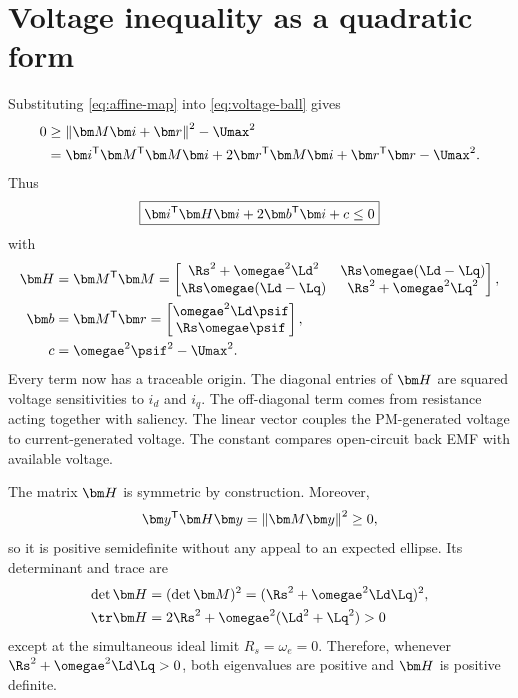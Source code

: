 \section{Voltage inequality as a quadratic form}

Substituting \cref{eq:affine-map} into \cref{eq:voltage-ball} gives
\begin{align}
0&\geq \norm{\Apsm\current+\vect r}^2-\Umax^2\\
 &=\current\trans\Apsm\trans\Apsm\current
   +2\vect r\trans\Apsm\current+\vect r\trans\vect r-\Umax^2.
\end{align}
Thus
\begin{equation}
 \boxed{\current\trans\Hpsm\current+2\vect b\trans\current+c\leq0}
 \label{eq:psm-general-quadratic}
\end{equation}
with
\begin{align}
\Hpsm&=\Apsm\trans\Apsm
=\begin{bmatrix}
\Rs^2+\omegae^2\Ld^2&\Rs\omegae(\Ld-\Lq)\\
\Rs\omegae(\Ld-\Lq)&\Rs^2+\omegae^2\Lq^2
\end{bmatrix},\label{eq:Hpsm}\\
\vect b&=\Apsm\trans\vect r
=\begin{bmatrix}\omegae^2\Ld\psif\\\Rs\omegae\psif\end{bmatrix},
\label{eq:bpsm}\\
c&=\omegae^2\psif^2-\Umax^2.\label{eq:cpsm}
\end{align}
Every term now has a traceable origin.  The diagonal entries of $\Hpsm$ are
squared voltage sensitivities to $i_d$ and $i_q$.  The off-diagonal term comes
from resistance acting together with saliency.  The linear vector couples the
PM-generated voltage to current-generated voltage.  The constant compares
open-circuit back EMF with available voltage.

The matrix $\Hpsm$ is symmetric by construction.  Moreover,
\begin{equation}
 \vect y\trans\Hpsm\vect y=\norm{\Apsm\vect y}^2\geq0,
\end{equation}
so it is positive semidefinite without any appeal to an expected ellipse.  Its
determinant and trace are
\begin{align}
\det\Hpsm&=(\det\Apsm)^2
=(\Rs^2+\omegae^2\Ld\Lq)^2,\label{eq:detH}\\
\tr\Hpsm&=2\Rs^2+\omegae^2(\Ld^2+\Lq^2)>0
\end{align}
except at the simultaneous ideal limit $R_s=\omega_e=0$.  Therefore, whenever
$\Rs^2+\omegae^2\Ld\Lq>0$, both eigenvalues are positive and $\Hpsm$ is
positive definite.


